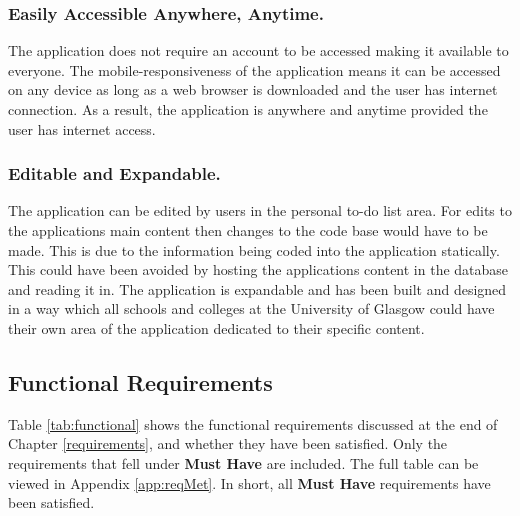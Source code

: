 \documentclass{l4proj}
\begin{document}
\subsubsection{Easily Accessible Anywhere,  Anytime.}
The application does not require an account to be accessed making it available to everyone. The mobile-responsiveness of the application means it can be accessed on any device as long as a web browser is downloaded and the user has internet connection. As a result,  the application is anywhere and anytime provided the user has internet access.

\subsubsection{Editable and Expandable.}
The application can be edited by users in the personal to-do list area. For edits to the applications main content then changes to the code base would have to be made. This is due to the information being coded into the application statically. This could have been avoided by hosting the applications content in the database and reading it in. The application is expandable and has been built and designed in a way which all schools and colleges at the University of Glasgow could have their own area of the application dedicated to their specific content.

\subsection{Functional Requirements}
Table \ref{tab:functional} shows the functional requirements discussed at the end of Chapter \ref{requirements},  and whether they have been satisfied. Only the requirements that fell under \textbf{Must Have} are included. The full table can be viewed in Appendix \ref{app:reqMet}. In short,  all \textbf{Must Have} requirements have been satisfied.
\end{document}
